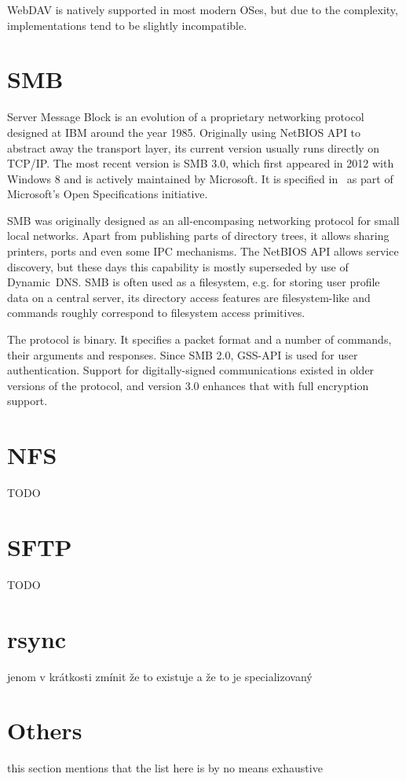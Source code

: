 WebDAV is natively supported in most modern OSes, but due to the complexity, implementations tend to be
slightly incompatible.

\section{SMB}

Server Message Block is an evolution of a proprietary networking protocol designed at IBM around the year
1985. Originally using NetBIOS API to abstract away the transport layer, its current version usually runs
directly on TCP/IP.  The most recent version is SMB 3.0, which first appeared in 2012 with Windows 8 and is
actively maintained by Microsoft. It is specified in~\cite{mssmb2} as part of Microsoft's Open Specifications
initiative.

SMB was originally designed as an all-encompasing networking protocol for small local networks. Apart from
publishing parts of directory trees, it allows sharing printers, ports and even some IPC mechanisms. The
NetBIOS API allows service discovery, but these days this capability is mostly superseded by use of
Dynamic~DNS. SMB is often used as a filesystem, e.g. for storing user profile data on a central server, its
directory access features are filesystem-like and commands roughly correspond to filesystem access primitives.

The protocol is binary. It specifies a packet format and a number of commands, their arguments and responses.
Since SMB 2.0, GSS-API is used for user authentication. Support for digitally-signed communications existed in
older versions of the protocol, and version 3.0 enhances that with full encryption support.

\section{NFS}

TODO

\section{SFTP}

TODO

\section{rsync}

jenom v krátkosti zmínit že to existuje a že to je specializovaný

\section{Others}

this section mentions that the list here is by no means exhaustive
